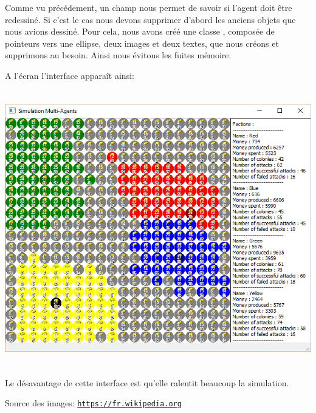   Comme vu précédement, un champ  nous permet de savoir si l’agent doit être redessiné. Si c’est le cas nous devons supprimer d’abord les anciens objets que nous avions dessiné. Pour cela, nous avons créé une classe , composée de pointeurs vers une ellipse, deux images et deux textes, que nous créons et supprimons au besoin. Ainsi nous évitons les fuites mémoire.
  
  A l’écran l’interface apparaît ainsi:
  \begin{center}
    \includegraphics[height=12cm]{images/gui.png}
  \end{center}

  Le désavantage de cette interface est qu’elle ralentit beaucoup la simulation.

  Source des images: \href{https://fr.wikipedia.org}{\texttt{https://fr.wikipedia.org}}
